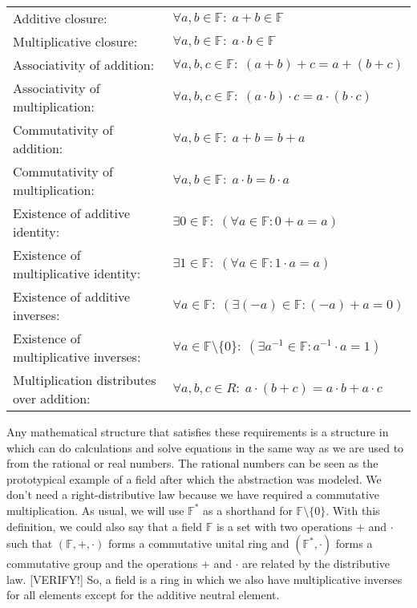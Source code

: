 \medskip
\begin{tabular}{l l}
Additive closure: 
& $\forall a,b \in \mathbb{F}: \; a + b \in \mathbb{F}$  \\	
Multiplicative closure: 
& $\forall a,b \in \mathbb{F}: \; a \cdot b \in \mathbb{F}$  \\	
Associativity of addition: 
& $\forall a,b,c \in \mathbb{F}: \;  (a + b) + c = a + (b + c)$   \\
Associativity of multiplication: 
& $\forall a,b,c \in \mathbb{F}: \;  (a \cdot b) \cdot c = a \cdot (b \cdot c)$   \\
Commutativity of addition: 
& $\forall a,b \in \mathbb{F}: \;  a + b = b + a$   \\
Commutativity of multiplication: 
& $\forall a,b \in \mathbb{F}: \;  a \cdot b = b \cdot a$   \\
Existence of additive identity: 
& $\exists 0 \in \mathbb{F}: \; (\forall a \in \mathbb{F}: 0 + a = a)$ \\
Existence of multiplicative identity: 
& $\exists 1 \in \mathbb{F}: \; (\forall a \in \mathbb{F}: 1 \cdot a = a)$ \\
Existence of additive inverses: 
& $\forall a \in \mathbb{F}: \; (\exists (-a) \in \mathbb{F}: (-a) + a = 0 )$ \\
Existence of multiplicative inverses: 
& $\forall a \in \mathbb{F} \setminus \{0\}: \; (\exists a^{-1} \in \mathbb{F}: a^{-1} \cdot a = 1 )$ \\
Multiplication distributes over addition: 
& $\forall a,b,c \in R: \;  a \cdot (b + c) = a \cdot b + a \cdot c$
\end{tabular}


Any mathematical structure that satisfies these requirements is a structure in which can do calculations and solve equations in the same way as we are used to from the rational or real numbers. The rational numbers can be seen as the prototypical example of a field after which the abstraction was modeled. We don't need a right-distributive law because we have required a commutative multiplication. As usual, we will use $\mathbb{F}^*$ as a shorthand for $\mathbb{F} \setminus \{0\}$. With this definition, we could also say that a field $\mathbb{F}$ is a set with two operations $+$ and $\cdot$ such that $(\mathbb{F},+,\cdot)$ forms a commutative unital ring and  $(\mathbb{F}^*,\cdot)$ forms a commutative group and the operations $+$ and $\cdot$ are related by the distributive law. [VERIFY!] So, a field is a ring in which we also have multiplicative inverses for all elements except for the additive neutral element.

